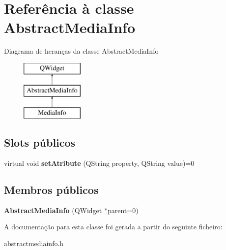 \hypertarget{class_abstract_media_info}{\section{Referência à classe Abstract\-Media\-Info}
\label{class_abstract_media_info}
}
Diagrama de heranças da classe Abstract\-Media\-Info\begin{figure}[H]
\begin{center}
\leavevmode
\includegraphics[height=3.000000cm]{class_abstract_media_info}
\end{center}
\end{figure}
\subsection*{Slots públicos}
\begin{DoxyCompactItemize}
\item 
\hypertarget{class_abstract_media_info_a59e096003b04baa551608fba8bed00d1}{virtual void {\bfseries set\-Atribute} (Q\-String property, Q\-String value)=0}\label{class_abstract_media_info_a59e096003b04baa551608fba8bed00d1}

\end{DoxyCompactItemize}
\subsection*{Membros públicos}
\begin{DoxyCompactItemize}
\item 
\hypertarget{class_abstract_media_info_a9e2f1e341c8be06217de939859c93045}{{\bfseries Abstract\-Media\-Info} (Q\-Widget $\ast$parent=0)}\label{class_abstract_media_info_a9e2f1e341c8be06217de939859c93045}

\end{DoxyCompactItemize}


A documentação para esta classe foi gerada a partir do seguinte ficheiro\-:\begin{DoxyCompactItemize}
\item 
abstractmediainfo.\-h\end{DoxyCompactItemize}
